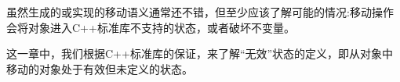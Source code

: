 虽然生成的或实现的移动语义通常还不错，但至少应该了解可能的情况:移动操作会将对象进入C++标准库不支持的状态，或者破坏不变量。\par

这一章中，我们根据C++标准库的保证，来了解“无效”状态的定义，即从对象中移动的对象处于有效但未定义的状态。\par